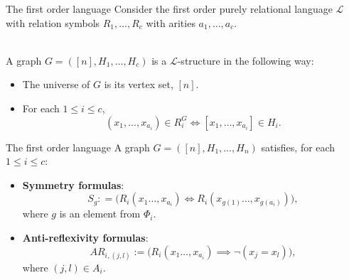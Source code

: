 \documentclass[11pt]{beamer}
\begin{document}
	\begin{frame}{The first order language}
	Consider the first order purely relational language $\mathcal{L}$ with relation symbols
	$R_1,\dots, R_c$ with arities $a_1,\dots,a_c$. \\~ \par
	
	A graph $G=([n],H_1,\dots, H_c)$ is a $\mathcal{L}$-structure in the following way:
	\begin{itemize}
		\item The universe of $G$ is its vertex set, $[n]$.
		\item For each $1\leq i \leq c$, 
		\[(x_1,\dots,x_{a_i})\in R_i^G \iff [x_1,\dots, x_{a_i}]\in H_i. \] 
	\end{itemize}
	\end{frame}

	\begin{frame}{The first order language}
		A graph $G=([n],H_1,\dots, H_n)$ satisfies, for each $1\leq i \leq c$:
		\vspace{0.5 em}
		\begin{itemize}
			\item \textbf{Symmetry formulas}:
			\[ S_g: =\big( R_i(x_1\dots,x_{a_i})\iff R_i(x_{g(1)}\dots,x_{g(a_i)})\big) ,\]
			where $g$ is an element from $\Phi_i$.
			\item \textbf{Anti-reflexivity formulas}:
			\[AR_{i,(j,l)}:=\big(R_i(x_1\dots,x_{a_i})\implies 
			\neg(x_j= x_l)\big),\]
			where $(j,l)\in A_i$.
		\end{itemize}
		
	\end{frame}
	 
\end{document}
